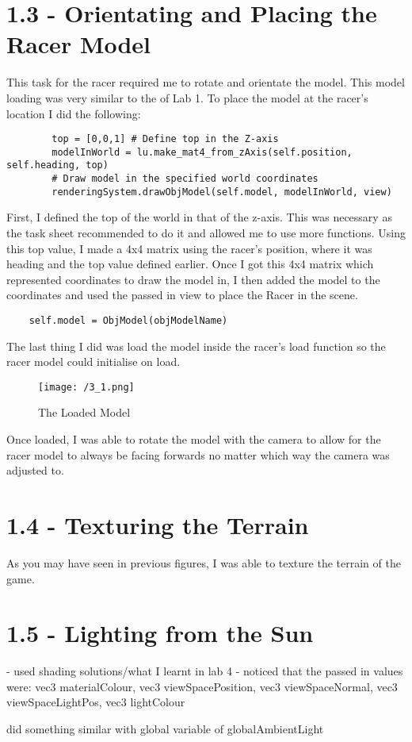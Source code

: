 \documentclass[11pt, oneside, a4paper]{article}
\begin{document}
\section*{1.3 - Orientating and Placing the Racer Model}
This task for the racer required me to rotate and orientate the model. This model loading was very similar to the of Lab 1. To place the model at the racer's location I did the following:

\begin{lstlisting}  
        top = [0,0,1] # Define top in the Z-axis
        modelInWorld = lu.make_mat4_from_zAxis(self.position, self.heading, top)
        # Draw model in the specified world coordinates
        renderingSystem.drawObjModel(self.model, modelInWorld, view) 
\end{lstlisting}

First, I defined the top of the world in that of the z-axis. This was necessary as the task sheet recommended to do it and allowed me to use more functions. Using this top value, I made a 4x4 matrix using the racer's position, where it was heading and the top value defined earlier. Once I got this 4x4 matrix which represented coordinates to draw the model in, I then added the model to the coordinates and used the passed in view to place the Racer in the scene. 

\begin{lstlisting}  
	self.model = ObjModel(objModelName)
\end{lstlisting}

The last thing I did was load the model inside the racer's load function so the racer model could initialise on load. 

\begin{figure}[!ht]
	\centerline{\texttt{[image: /3\_1.png]}}
	\caption{The Loaded Model}
	\label{fig:figure3}
\end{figure}
Once loaded, I was able to rotate the model with the camera to allow for the racer model to always be facing forwards no matter which way the camera was adjusted to.

\section*{1.4 - Texturing the Terrain}
As you may have seen in previous figures, I was able to texture the terrain of the game.

\section*{1.5 - Lighting from the Sun}
- used shading solutions/what I learnt in lab 4
- noticed that the passed in values were:
vec3 materialColour, vec3 viewSpacePosition, vec3 viewSpaceNormal, vec3 viewSpaceLightPos, vec3 lightColour

did something similar
with global variable of globalAmbientLight
\end{document}

